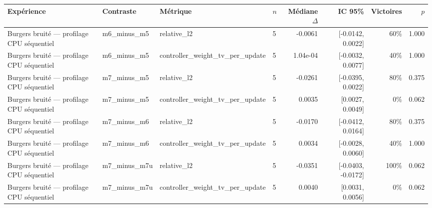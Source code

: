 \begin{tabular}{llllrrrr}
\toprule
Expérience & Contraste & Métrique & $n$ & Médiane $\Delta$ & IC 95\% & Victoires & $p$ \\
\midrule
Burgers bruité — profilage CPU séquentiel & m6\_minus\_m5 & relative\_l2 & 5 & -0.0061 & [-0.0142, 0.0022] & 60\% & 1.000 \\
Burgers bruité — profilage CPU séquentiel & m6\_minus\_m5 & controller\_weight\_tv\_per\_update & 5 & 1.04e-04 & [-0.0032, 0.0077] & 40\% & 1.000 \\
Burgers bruité — profilage CPU séquentiel & m7\_minus\_m5 & relative\_l2 & 5 & -0.0261 & [-0.0395, 0.0022] & 80\% & 0.375 \\
Burgers bruité — profilage CPU séquentiel & m7\_minus\_m5 & controller\_weight\_tv\_per\_update & 5 & 0.0035 & [0.0027, 0.0049] & 0\% & 0.062 \\
Burgers bruité — profilage CPU séquentiel & m7\_minus\_m6 & relative\_l2 & 5 & -0.0170 & [-0.0412, 0.0164] & 80\% & 0.375 \\
Burgers bruité — profilage CPU séquentiel & m7\_minus\_m6 & controller\_weight\_tv\_per\_update & 5 & 0.0034 & [-0.0028, 0.0060] & 40\% & 1.000 \\
Burgers bruité — profilage CPU séquentiel & m7\_minus\_m7u & relative\_l2 & 5 & -0.0351 & [-0.0403, -0.0172] & 100\% & 0.062 \\
Burgers bruité — profilage CPU séquentiel & m7\_minus\_m7u & controller\_weight\_tv\_per\_update & 5 & 0.0040 & [0.0031, 0.0056] & 0\% & 0.062 \\
\bottomrule
\end{tabular}
